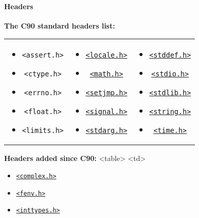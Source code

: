 \paragraph{Headers}
\textbf{The C90 standard headers list:}
\begin{tabular}{c c c}
\begin{itemize}
	\item \texttt{\textless{}assert.h\textgreater{}}
	\item \texttt{\textless{}ctype.h\textgreater{}}
	\item \texttt{\textless{}errno.h\textgreater{}}
	\item \texttt{\textless{}float.h\textgreater{}}
	\item \texttt{\textless{}limits.h\textgreater{}}
\end{itemize}
&
\begin{itemize}
	\item \texttt{\href{http://en.wikipedia.org/wiki/Locale.h}{\textless{}locale.h\textgreater{}}}
	\item \texttt{\href{http://en.wikipedia.org/wiki/Math.h}{\textless{}math.h\textgreater{}}}
	\item \texttt{\href{http://en.wikipedia.org/wiki/Setjmp.h}{\textless{}setjmp.h\textgreater{}}}
	\item \texttt{\href{http://en.wikipedia.org/wiki/Signal.h}{\textless{}signal.h\textgreater{}}}
	\item \texttt{\href{http://en.wikipedia.org/wiki/Stdarg.h}{\textless{}stdarg.h\textgreater{}}}
\end{itemize}
&
\begin{itemize}
	\item \texttt{\href{http://en.wikipedia.org/wiki/Stddef.h}{\textless{}stddef.h\textgreater{}}}
	\item \texttt{\href{http://en.wikipedia.org/wiki/Stdio.h}{\textless{}stdio.h\textgreater{}}}
	\item \texttt{\href{http://en.wikipedia.org/wiki/Stdlib.h}{\textless{}stdlib.h\textgreater{}}}
	\item \texttt{\href{http://en.wikipedia.org/wiki/String.h}{\textless{}string.h\textgreater{}}}
	\item \texttt{\href{http://en.wikipedia.org/wiki/Time.h}{\textless{}time.h\textgreater{}}}
\end{itemize}
\end{tabular}

\textbf{Headers added since C90:}
\textless{}table\textgreater{}
\textless{}td\textgreater{}
\begin{itemize}
	\item \texttt{\href{http://en.wikipedia.org/wiki/Complex.h}{\textless{}complex.h\textgreater{}}}
	\item \texttt{\href{http://en.wikipedia.org/wiki/Fenv.h}{\textless{}fenv.h\textgreater{}}}
	\item \texttt{\href{http://en.wikipedia.org/wiki/Inttypes.h}{\textless{}inttypes.h\textgreater{}}}
\end{itemize}

